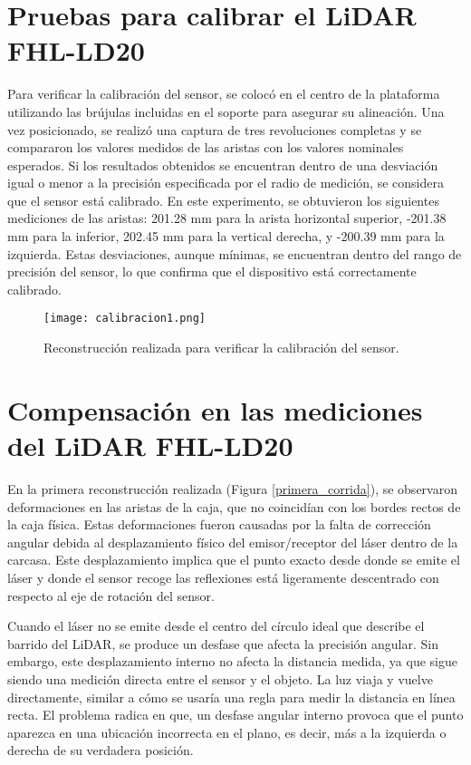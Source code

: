 \section{Pruebas para calibrar el LiDAR FHL-LD20}
Para verificar la calibración del sensor, se colocó en el centro de la plataforma utilizando las brújulas incluidas en el soporte para asegurar su alineación. Una vez posicionado, se realizó una captura de tres revoluciones completas y se compararon los valores medidos de las aristas con los valores nominales esperados. Si los resultados obtenidos se encuentran dentro de una desviación igual o menor a la precisión especificada por el radio de medición, se considera que el sensor está calibrado. En este experimento, se obtuvieron los siguientes mediciones de las aristas: 201.28 mm para la arista horizontal superior, -201.38 mm para la inferior, 202.45 mm para la vertical derecha, y -200.39 mm para la izquierda. Estas desviaciones, aunque mínimas, se encuentran dentro del rango de precisión del sensor, lo que confirma que el dispositivo está correctamente calibrado. 

\begin{figure}[H]
	\centering
	\texttt{[image: calibracion1.png]}
	\caption{Reconstrucción realizada para verificar la calibración del sensor.}
	\label{fig:calibracion}
\end{figure}

\section{Compensación en las mediciones del LiDAR FHL-LD20}
\label{sec:calibracion}

En la primera reconstrucción realizada (Figura \ref{primera_corrida}), se observaron deformaciones en las aristas de la caja, que no coincidían con los bordes rectos de la caja física. Estas deformaciones fueron causadas por la falta de corrección angular debida al desplazamiento físico del emisor/receptor del láser dentro de la carcasa. Este desplazamiento implica que el punto exacto desde donde se emite el láser y donde el sensor recoge las reflexiones está ligeramente descentrado con respecto al eje de rotación del sensor.

Cuando el láser no se emite desde el centro del círculo ideal que describe el barrido del LiDAR, se produce un desfase que afecta la precisión angular. Sin embargo, este desplazamiento interno no afecta la distancia medida, ya que sigue siendo una medición directa entre el sensor y el objeto. La luz viaja y vuelve directamente, similar a cómo se usaría una regla para medir la distancia en línea recta. El problema radica en que, un desfase angular interno provoca que el punto aparezca en una ubicación incorrecta en el plano, es decir, más a la izquierda o derecha de su verdadera posición.

